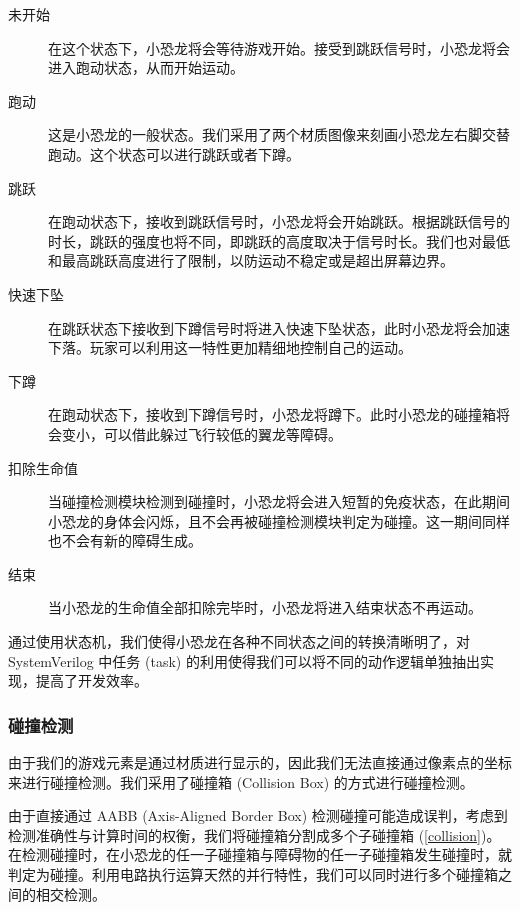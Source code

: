 \documentclass[UTF8, 11pt, fontset=none]{ctexart}
\begin{document}
\begin{description}
    \item[未开始] 在这个状态下，小恐龙将会等待游戏开始。接受到跳跃信号时，小恐龙将会进入跑动状态，从而开始运动。
    \item[跑动] 这是小恐龙的一般状态。我们采用了两个材质图像来刻画小恐龙左右脚交替跑动。这个状态可以进行跳跃或者下蹲。 
    \item[跳跃] 在跑动状态下，接收到跳跃信号时，小恐龙将会开始跳跃。根据跳跃信号的时长，跳跃的强度也将不同，即跳跃的高度取决于信号时长。我们也对最低和最高跳跃高度进行了限制，以防运动不稳定或是超出屏幕边界。
    \item[快速下坠] 在跳跃状态下接收到下蹲信号时将进入快速下坠状态，此时小恐龙将会加速下落。玩家可以利用这一特性更加精细地控制自己的运动。
    \item[下蹲] 在跑动状态下，接收到下蹲信号时，小恐龙将蹲下。此时小恐龙的碰撞箱将会变小，可以借此躲过飞行较低的翼龙等障碍。
    \item[扣除生命值] 当碰撞检测模块检测到碰撞时，小恐龙将会进入短暂的免疫状态，在此期间小恐龙的身体会闪烁，且不会再被碰撞检测模块判定为碰撞。这一期间同样也不会有新的障碍生成。
    \item[结束] 当小恐龙的生命值全部扣除完毕时，小恐龙将进入结束状态不再运动。
\end{description}

通过使用状态机，我们使得小恐龙在各种不同状态之间的转换清晰明了，对 SystemVerilog 中任务 (task) 的利用使得我们可以将不同的动作逻辑单独抽出实现，提高了开发效率。

\subsubsection{碰撞检测}

由于我们的游戏元素是通过材质进行显示的，因此我们无法直接通过像素点的坐标来进行碰撞检测。我们采用了碰撞箱 (Collision Box) 的方式进行碰撞检测。

由于直接通过 AABB (Axis-Aligned Border Box) 检测碰撞可能造成误判，考虑到检测准确性与计算时间的权衡，我们将碰撞箱分割成多个子碰撞箱 (\cref{collision})。在检测碰撞时，在小恐龙的任一子碰撞箱与障碍物的任一子碰撞箱发生碰撞时，就判定为碰撞。利用电路执行运算天然的并行特性，我们可以同时进行多个碰撞箱之间的相交检测。
\end{document}

